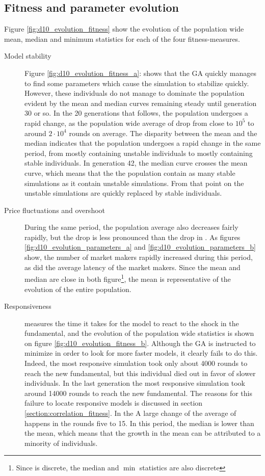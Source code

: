 \subsection{Fitness and parameter evolution}
Figure \ref{fig:d10_evolution_fitness} show the evolution of the population wide mean, median and minimum statistics for each of the four fitness-measures. 
\begin{description}
\item[Model stability]
Figure \ref{fig:d10_evolution_fitness_a}: shows that  the GA quickly manages to find some parameters which cause the simulation to stabilize quickly. However, these individuals do not manage to dominate the population evident by the mean and median curves remaining steady until generation 30 or so. In the 20 generations that follows, the population undergoes a rapid change, as the population wide average of \roundstable drop from close to $10^5$ to around $2\cdot 10^4$ rounds on average. The disparity between the mean and the median indicates that the population undergoes a rapid change in the same period, from mostly containing unstable individuals to mostly containing stable individuals. In generation 42, the median curve crosses the mean curve, which means that the the population contain as many stable simulations as it contain unstable simulations. From that point on the unstable simulations are quickly replaced by stable individuals.
\item[Price fluctuations and overshoot] During the same period, the population average \stdev also decreases fairly rapidly, but the drop is less pronounced than the drop in \stdev. As figures \ref{fig:d10_evolution_parameters_a} and \ref{fig:d10_evolution_parameters_b} show, the number of market makers rapidly increased during this period, as did the average latency of the market makers. Since the mean and median are close in both figure\footnote{Since \overshoot is discrete, the median and $\min$ statistics are also discrete}, the mean is representative of the evolution of the entire population.
\item[Responsiveness] \timetoreachnewfundamental measures the time it takes for the model to react to the shock in the fundamental, and the evolution of the population wide statistics is shown on figure \ref{fig:d10_evolution_fitness_b}. Although the GA is instructed to minimize \timetoreachnewfundamental in order to look for more faster models, it clearly fails to do this. Indeed, the most responsive simulation took only about 4000 rounds to reach the new fundamental, but this individual died out in favor of slower individuals. In the last generation the most responsive simulation took around 14000 rounds to reach the new fundamental. The reasons for this failure to locate responsive models is discussed in section \ref{section:correlation_fitness}. In the A large change of the average of \timetoreachnewfundamental happens in the rounds five to 15. In this period, the median is lower than the mean, which means that the growth in the mean can be attributed to a minority of individuals.
\end{description}

